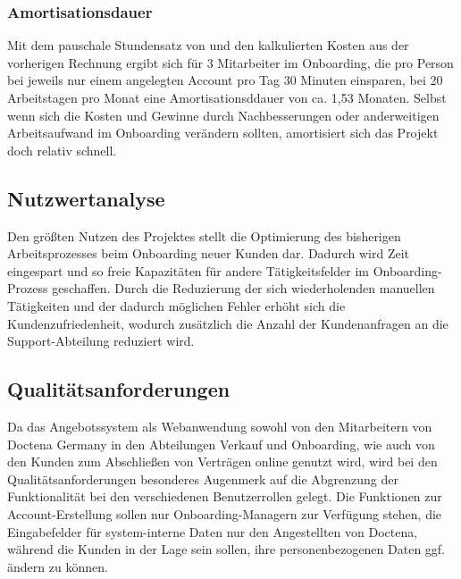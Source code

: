 
\subsubsection{Amortisationsdauer}
\label{sec:Amortisationsdauer}

Mit dem pauschale Stundensatz von  und den kalkulierten Kosten aus der vorherigen Rechnung ergibt sich für 3 Mitarbeiter im Onboarding, die pro Person bei jeweils nur einem angelegten Account pro Tag 30 Minuten einsparen, bei 20 Arbeitstagen pro Monat eine Amortisationsddauer von ca. 1,53 Monaten. Selbst wenn sich die Kosten und Gewinne durch Nachbesserungen oder anderweitigen Arbeitsaufwand im Onboarding verändern sollten, amortisiert sich das Projekt doch relativ schnell.


\subsection{Nutzwertanalyse}
\label{sec:Nutzwertanalyse}
Den größten Nutzen des Projektes stellt die Optimierung des bisherigen Arbeitsprozesses beim Onboarding neuer Kunden dar. Dadurch wird Zeit eingespart und so freie Kapazitäten für andere Tätigkeitsfelder im Onboarding-Prozess geschaffen. Durch die Reduzierung der sich wiederholenden manuellen Tätigkeiten und der dadurch möglichen Fehler erhöht sich die Kundenzufriedenheit, wodurch zusätzlich die Anzahl der Kundenanfragen an die Support-Abteilung reduziert wird.


\subsection{Qualitätsanforderungen}
\label{sec:Qualitaetsanforderungen}
Da das Angebotssystem als Webanwendung sowohl von den Mitarbeitern von Doctena Germany in den Abteilungen Verkauf und Onboarding, wie auch von den Kunden zum Abschließen von Verträgen online genutzt wird, wird bei den Qualitätsanforderungen besonderes Augenmerk auf die Abgrenzung der Funktionalität bei den verschiedenen Benutzerrollen gelegt. Die Funktionen zur Account-Erstellung sollen nur Onboarding-Managern zur Verfügung stehen, die Eingabefelder für system-interne Daten nur den Angestellten von Doctena, während die Kunden in der Lage sein sollen, ihre personenbezogenen Daten ggf. ändern zu können.

